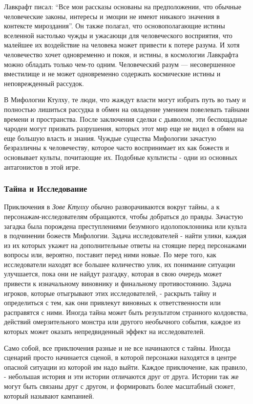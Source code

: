 \documentclass[letterpaper,twocolumn,openany, twoside, 11pt, usenames]{cocbook}
\begin{document}
Лавкрафт писал: ``Все мои рассказы основаны на предположении, что обычные человеческие законы, интересы и эмоции не имеют никакого значения в контексте мироздания''. Он также полагал, что основополагающие истины вселенной настолько чужды и ужасающи для человеческого восприятия, что малейшее их воздействие на человека может привести к потере разума. И хотя человечество хочет одновременно и покоя, и истины, в космологии Лавкрафта можно обладать только чем-то одним. Человеческий разум --- несовершенное вместилище и не может одновременно содержать космические истины и неповрежденный рассудок.

В Мифологии Ктулху, те люди, что жаждут власти могут избрать путь во тьму и полностью лишиться рассудка в обмен на овладение умением повелевать тайнами времени и пространства. После заключения сделки с дьяволом, эти беспощадные чародеи могут призвать разрушения, которых этот мир еще не видел в обмен на еще большую власть и знания. Чуждые существа Мифологии зачастую безразличны к человечеству, которое часто воспринимает их как божеств и основывает культы, почитающие их. Подобные культисты - одни из основных антагонистов в этой игре.

\subsubsection*{\nohyphens{Тайна и Исследование}}

Приключения в {\it Зове Ктулху} обычно разворачиваются вокруг тайны, а к персонажам-исследователям обращаются, чтобы добраться до правды. Зачастую загадка была порождена преступлениями безумного идолопоклонника или культа в подчинении божеств Мифологии. Задача исследователей - найти улики, каждая из их которых укажет на дополнительные ответы на стоящие перед персонажами вопросы или, вероятно, поставит перед ними новые. По мере того, как исследователи находят все большее количество улик, их понимание ситуации улучшается, пока они не найдут разгадку, которая в свою очередь может привести к изначальному виновнику и финальному противостоянию. Задача игроков, которые отыгрывают этих исследователей, - раскрыть тайну и определиться с тем, как они привлекут виновных к ответственности или расправятся с ними. Иногда тайна может быть результатом странного колдовства, действий омерзительного монстра или другого необычного события, каждое из которых может оказать непредвиденный эффект на исследователей.

Само собой, все приключения разные и не все начинаются с тайны. Иногда сценарий просто начинается сценой, в которой персонажи находятся в центре опасной ситуации из которой им надо выйти. Каждое приключение, как правило, - небольшая история и эти истории отличаются друг от друга. Истории так же могут быть связаны друг с другом, и формировать более масштабный сюжет, который называют кампанией.
\end{document}
